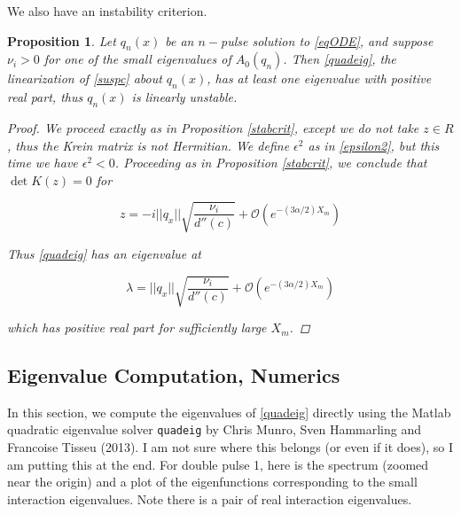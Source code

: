 \documentclass[12pt]{article}
\newtheorem{proposition}{Proposition}
\begin{document}
We also have an instability criterion.


\begin{proposition}\label{instabcrit}
Let $q_n(x)$ be an $n-$pulse solution to \eqref{eqODE}, and suppose $\nu_i > 0$ for one of the small eigenvalues of $A_0(q_n)$. Then \eqref{quadeig}, the linearization of \eqref{suspc} about $q_n(x)$, has at least one eigenvalue with positive real part, thus $q_n(x)$ is linearly unstable.

\begin{proof}
We proceed exactly as in Proposition \ref{stabcrit}, except we do not take $z \in R$, thus the Krein matrix is not Hermitian. We define $\epsilon^2$ as in \eqref{epsilon2}, but this time we have $\epsilon^2 < 0$. Proceeding as in Proposition \ref{stabcrit}, we conclude that $\det K(z) = 0$ for 

\begin{equation}
z = -i ||q_x|| \sqrt{ \frac{ \nu_i}{d''(c)} } + \mathcal{O}(e^{-(3 \alpha/2) X_m})
\end{equation}

Thus \eqref{quadeig} has an eigenvalue at

\begin{equation}
\lambda = ||q_x|| \sqrt{ \frac{ \nu_i}{d''(c)} } + \mathcal{O}(e^{-(3 \alpha/2) X_m})
\end{equation}

which has positive real part for sufficiently large $X_m$. 

\end{proof}
\end{proposition}


\subsection{Eigenvalue Computation, Numerics}

In this section, we compute the eigenvalues of \eqref{quadeig} directly using the Matlab quadratic eigenvalue solver \texttt{quadeig} by Chris Munro, Sven Hammarling and Francoise Tisseu (2013). I am not sure where this belongs (or even if it does), so I am putting this at the end. For double pulse 1, here is the spectrum (zoomed near the origin) and a plot of the eigenfunctions corresponding to the small interaction eigenvalues. Note there is a pair of real interaction eigenvalues.
\end{document}
